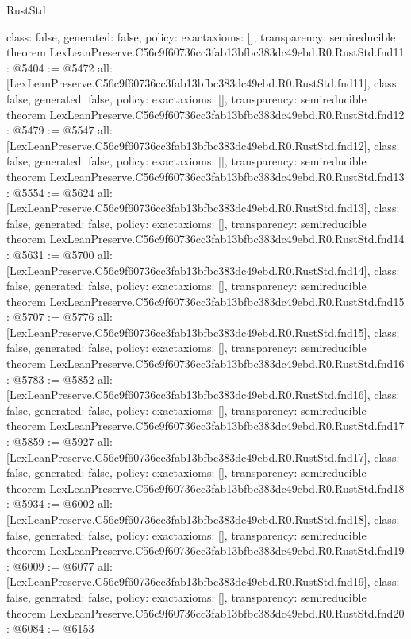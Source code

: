 \begin{lexlean}{RustStd}
\begin{coremodule}
{  class: false,
  generated: false,
  policy: exact{axioms: []},
  transparency: semireducible
}
theorem LexLeanPreserve.C56c9f60736cc3fab13bfbc383dc49ebd.R0.RustStd.fnd11 : @5404 := @5472 {
  all: [LexLeanPreserve.C56c9f60736cc3fab13bfbc383dc49ebd.R0.RustStd.fnd11],
  class: false,
  generated: false,
  policy: exact{axioms: []},
  transparency: semireducible
}
theorem LexLeanPreserve.C56c9f60736cc3fab13bfbc383dc49ebd.R0.RustStd.fnd12 : @5479 := @5547 {
  all: [LexLeanPreserve.C56c9f60736cc3fab13bfbc383dc49ebd.R0.RustStd.fnd12],
  class: false,
  generated: false,
  policy: exact{axioms: []},
  transparency: semireducible
}
theorem LexLeanPreserve.C56c9f60736cc3fab13bfbc383dc49ebd.R0.RustStd.fnd13 : @5554 := @5624 {
  all: [LexLeanPreserve.C56c9f60736cc3fab13bfbc383dc49ebd.R0.RustStd.fnd13],
  class: false,
  generated: false,
  policy: exact{axioms: []},
  transparency: semireducible
}
theorem LexLeanPreserve.C56c9f60736cc3fab13bfbc383dc49ebd.R0.RustStd.fnd14 : @5631 := @5700 {
  all: [LexLeanPreserve.C56c9f60736cc3fab13bfbc383dc49ebd.R0.RustStd.fnd14],
  class: false,
  generated: false,
  policy: exact{axioms: []},
  transparency: semireducible
}
theorem LexLeanPreserve.C56c9f60736cc3fab13bfbc383dc49ebd.R0.RustStd.fnd15 : @5707 := @5776 {
  all: [LexLeanPreserve.C56c9f60736cc3fab13bfbc383dc49ebd.R0.RustStd.fnd15],
  class: false,
  generated: false,
  policy: exact{axioms: []},
  transparency: semireducible
}
theorem LexLeanPreserve.C56c9f60736cc3fab13bfbc383dc49ebd.R0.RustStd.fnd16 : @5783 := @5852 {
  all: [LexLeanPreserve.C56c9f60736cc3fab13bfbc383dc49ebd.R0.RustStd.fnd16],
  class: false,
  generated: false,
  policy: exact{axioms: []},
  transparency: semireducible
}
theorem LexLeanPreserve.C56c9f60736cc3fab13bfbc383dc49ebd.R0.RustStd.fnd17 : @5859 := @5927 {
  all: [LexLeanPreserve.C56c9f60736cc3fab13bfbc383dc49ebd.R0.RustStd.fnd17],
  class: false,
  generated: false,
  policy: exact{axioms: []},
  transparency: semireducible
}
theorem LexLeanPreserve.C56c9f60736cc3fab13bfbc383dc49ebd.R0.RustStd.fnd18 : @5934 := @6002 {
  all: [LexLeanPreserve.C56c9f60736cc3fab13bfbc383dc49ebd.R0.RustStd.fnd18],
  class: false,
  generated: false,
  policy: exact{axioms: []},
  transparency: semireducible
}
theorem LexLeanPreserve.C56c9f60736cc3fab13bfbc383dc49ebd.R0.RustStd.fnd19 : @6009 := @6077 {
  all: [LexLeanPreserve.C56c9f60736cc3fab13bfbc383dc49ebd.R0.RustStd.fnd19],
  class: false,
  generated: false,
  policy: exact{axioms: []},
  transparency: semireducible
}
theorem LexLeanPreserve.C56c9f60736cc3fab13bfbc383dc49ebd.R0.RustStd.fnd20 : @6084 := @6153 {
}
\end{coremodule}
\end{lexlean}
